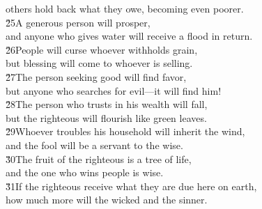 \begin{poetry}
\poemll    others hold back what they owe, becoming even poorer. \\
\poeml \v{25}A generous person will prosper, \\
\poemll    and anyone who gives water will receive a flood in return. \\
\poeml \v{26}People will curse whoever withholds grain, \\
\poemll    but blessing will come to whoever is selling. \\
\poeml \v{27}The person seeking good will find favor, \\
\poemll    but anyone who searches for evil---it will find him! \\
\poeml \v{28}The person who trusts in his wealth will fall, \\
\poemll    but the righteous will flourish like green leaves. \\
\poeml \v{29}Whoever troubles his household will inherit the wind, \\
\poemll    and the fool will be a servant to the wise. \\
\poeml \v{30}The fruit of the righteous is a tree of life, \\
\poemll    and the one who wins people is wise. \\
\poeml \v{31}If the righteous receive what they are due here on earth, \\
\poemll    how much more will the wicked and the sinner.
\end{poetry}

